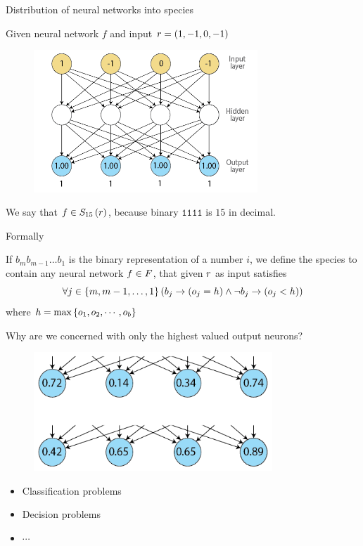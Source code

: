 \begin{frame}{Distribution of neural networks into species}
\begin{center}
Given neural network $f$ and input $r = (1, -1, 0, -1)$
  \begin{figure}[p]
  \includegraphics[width=0.75\textwidth]{images/nntdexample3.png}
  \end{figure}
We say that $f \in S_{15}\left(r\right)$, because binary $\texttt{1111}$ is $15$ in decimal.
\end{center}
\end{frame}

\begin{frame}{Formally}
\begin{center}
If $b_{m}b_{m-1}\dots b_1$ is the binary representation of a number $i$, we define the species  to contain any neural network $f \in F$, that given $r$ as input satisfies
\begin{equation}
  \forall j \in \left\{ m, m-1, \dots, 1 \right\} \left(b_j \rightarrow (o_j = h) \wedge \neg b_j \rightarrow (o_j < h)\right)
\end{equation}
where $h = \max\left\{ o_1, o_2, \cdots, o_b \right\}$
\end{center}
\end{frame}

\begin{frame}{Why are we concerned with only the highest valued output neurons?}
\begin{center}
  \begin{figure}[p]
  \includegraphics[width=0.8\textwidth]{images/whyhighestvalue.png}
  \end{figure}
\begin{itemize}
	\item Classification problems
	\item Decision problems
	\item $\cdots$
\end{itemize}
\end{center}
\end{frame}

